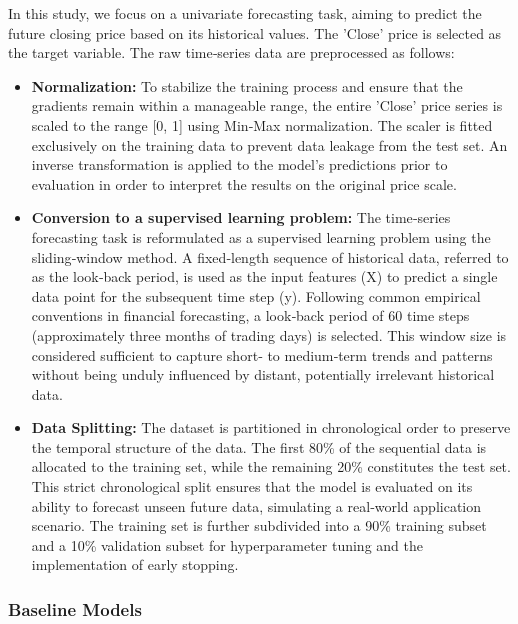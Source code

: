\documentclass{cys}
\begin{document}
\begin{enumerate}
In this study, we focus on a univariate forecasting task, aiming to predict the future closing price based on its historical values. The 'Close' price is selected as the target variable. The raw time‑series data are preprocessed as follows: \\
\begin{itemize}
        \item \textbf{Normalization:}
        To stabilize the training process and ensure that the gradients remain within a manageable range, the entire 'Close' price series is scaled to the range [0, 1] using Min‑Max normalization. The scaler is fitted exclusively on the training data to prevent data leakage from the test set. An inverse transformation is applied to the model's predictions prior to evaluation in order to interpret the results on the original price scale.\\
        \item \textbf{Conversion to a supervised learning problem:}
        The time‑series forecasting task is reformulated as a supervised learning problem using the sliding‑window method. A fixed‑length sequence of historical data, referred to as the look‑back period, is used as the input features (X) to predict a single data point for the subsequent time step (y). Following common empirical conventions in financial forecasting, a look‑back period of 60 time steps (approximately three months of trading days) is selected. This window size is considered sufficient to capture short‑ to medium‑term trends and patterns without being unduly influenced by distant, potentially irrelevant historical data.\\
        \item \textbf{Data Splitting:}
        The dataset is partitioned in chronological order to preserve the temporal structure of the data. The first 80\% of the sequential data is allocated to the training set, while the remaining 20\% constitutes the test set. This strict chronological split ensures that the model is evaluated on its ability to forecast unseen future data, simulating a real‑world application scenario. The training set is further subdivided into a 90\% training subset and a 10\% validation subset for hyperparameter tuning and the implementation of early stopping.
    \end{itemize}

\subsubsection{Baseline Models}
    

\end{enumerate}
\end{document}
